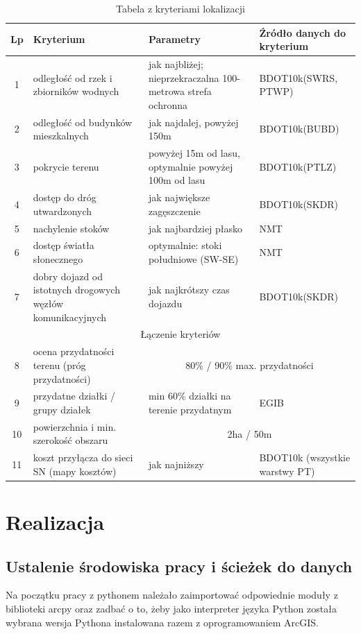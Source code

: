 \documentclass{article}
\begin{document}
\begin{table}[h!]
    \centering
    \renewcommand{\arraystretch}{1.4}
    \begin{tabular}{|c|p{4cm}|p{5cm}|p{3.5cm}|}
    \hline
    \textbf{Lp} & \textbf{Kryterium} & \textbf{Parametry} & \textbf{Źródło danych do kryterium} \\ \hline
    1 & odległość od rzek i zbiorników wodnych & jak najbliżej; nieprzekraczalna 100-metrowa strefa ochronna & BDOT10k(SWRS, PTWP)\\ \hline
    2 & odległość od budynków mieszkalnych & jak najdalej, powyżej 150m & BDOT10k(BUBD)\\ \hline
    3 & pokrycie terenu & powyżej 15m od lasu, optymalnie powyżej 100m od lasu & BDOT10k(PTLZ)\\ \hline
    4 & dostęp do dróg utwardzonych & jak największe zagęszczenie & BDOT10k(SKDR)\\ \hline
    5 & nachylenie stoków & jak najbardziej płasko & NMT\\ \hline
    6 & dostęp światła słonecznego & optymalnie: stoki południowe (SW-SE) & NMT\\ \hline
    7 & dobry dojazd od istotnych drogowych węzłów komunikacyjnych & jak najkrótszy czas dojazdu & BDOT10k(SKDR)\\ \hline
    \multicolumn{4}{|c|}{Łączenie kryteriów} \\ \hline
    8 & ocena przydatności terenu (próg przydatności) & \multicolumn{2}{|c|}{80\% / 90\% max. przydatności}\\ \hline
    9 & przydatne działki / grupy działek & min 60\% działki na terenie przydatnym & EGIB \\ \hline
    10 & powierzchnia i min. szerokość obszaru & \multicolumn{2}{|c|}{2ha / 50m}\\ \hline
    11 & koszt przyłącza do sieci SN (mapy kosztów) & jak najniższy & BDOT10k (wszystkie warstwy PT)\\ \hline
    \end{tabular}
    \caption{Tabela z kryteriami lokalizacji}
    \label{tab:kryteria}
    \end{table}
\newpage

\section{Realizacja}
\subsection{Ustalenie środowiska pracy i ścieżek do danych}
Na początku pracy z pythonem należało zaimportować odpowiednie moduły z biblioteki arcpy oraz zadbać o to, żeby jako interpreter języka Python została wybrana wersja Pythona instalowana razem z oprogramowaniem ArcGIS.
\end{document}
